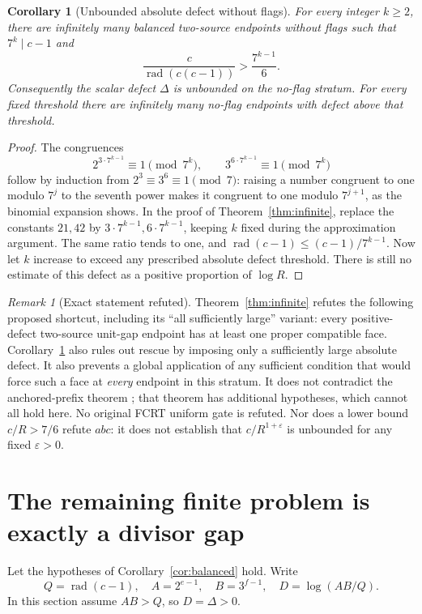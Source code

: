 \documentclass[11pt]{article}
\newtheorem{corollary}[theorem]{Corollary}
\theoremstyle{definition}\newtheorem{definition}[theorem]{Definition}
\theoremstyle{remark}\newtheorem{remark}[theorem]{Remark}
\newcommand{\rad}{\operatorname{rad}}
\begin{document}
\begin{corollary}[Unbounded absolute defect without flags]\label{cor:unbounded}
For every integer \(k\ge2\), there are infinitely many balanced two-source
endpoints without flags such that \(7^k\mid c-1\) and
\[
 \frac{c}{\rad(c(c-1))}>\frac{7^{k-1}}6.
\]
Consequently the scalar defect \(\Delta\) is unbounded on the no-flag
stratum. For every fixed threshold there are infinitely many no-flag
endpoints with defect above that threshold.
\end{corollary}
\begin{proof}
The congruences
\[
 2^{3\cdot7^{k-1}}\equiv1\pmod{7^k},\qquad
 3^{6\cdot7^{k-1}}\equiv1\pmod{7^k}
\]
follow by induction from \(2^3\equiv3^6\equiv1\pmod7\): raising a number
congruent to one modulo \(7^j\) to the seventh power makes it congruent to
one modulo \(7^{j+1}\), as the binomial expansion shows. In the proof of
Theorem~\ref{thm:infinite}, replace the constants \(21,42\) by
\(3\cdot7^{k-1},6\cdot7^{k-1}\), keeping \(k\) fixed during the
approximation argument. The same ratio tends to one, and
\(\rad(c-1)\le(c-1)/7^{k-1}\). Now let \(k\) increase to exceed any
prescribed absolute defect threshold. There is still no estimate of this
defect as a positive proportion of \(\log R\).
\end{proof}

\begin{remark}[Exact statement refuted]
Theorem~\ref{thm:infinite} refutes the following proposed shortcut, including
its ``all sufficiently large'' variant: every positive-defect two-source
unit-gap endpoint has at least one proper compatible face. Corollary~\ref{cor:unbounded}
also rules out rescue by imposing only a sufficiently large absolute defect. It also prevents
a global application of any sufficient condition that would force such a
face at \emph{every} endpoint in this stratum. It does not contradict the
anchored-prefix theorem \cite{repoanchor}; that theorem has additional
hypotheses, which cannot all hold here. No original FCRT uniform gate is
refuted. Nor does a lower bound \(c/R>7/6\) refute \(abc\): it does not
establish that \(c/R^{1+\varepsilon}\) is unbounded for any fixed
\(\varepsilon>0\).
\end{remark}

\section{The remaining finite problem is exactly a divisor gap}
Let the hypotheses of Corollary~\ref{cor:balanced} hold. Write
\[
 Q=\rad(c-1),\quad A=2^{e-1},\quad B=3^{f-1},\quad D=\log(AB/Q).
\]
In this section assume \(AB>Q\), so \(D=\Delta>0\).
\end{document}
